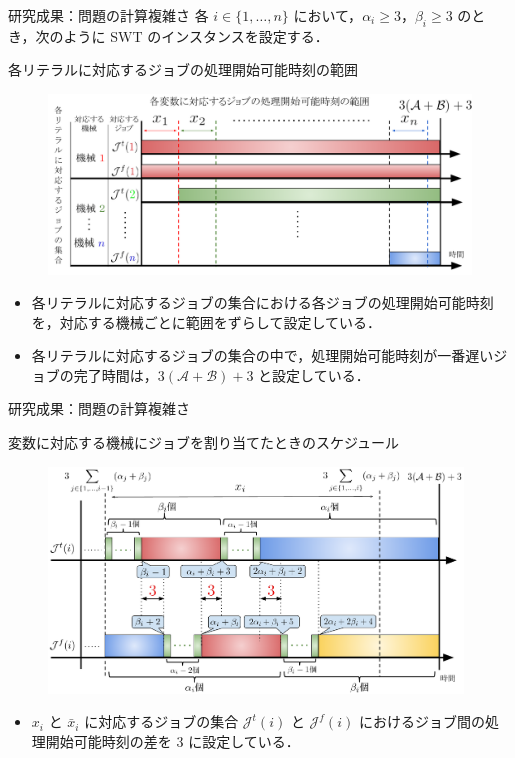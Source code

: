 \documentclass[dvipdfmx]{beamer}
\begin{document}
    \begin{frame}{研究成果：問題の計算複雑さ}
      各 $i \in \{ 1,\ldots,n\}$ において，$\alpha_i \ge 3$，$\beta_i \ge 3$ のとき，次のように SWT のインスタンスを設定する．
      \begin{block}{各リテラルに対応するジョブの処理開始可能時刻の範囲}
        \begin{figure}[h]
          \centering
          \includegraphics[width = 10 cm]{figure/3SAT3.pdf}
        \end{figure}
      \end{block}
      \begin{itemize}
        \item 各リテラルに対応するジョブの集合における各ジョブの処理開始可能時刻を，対応する機械ごとに範囲をずらして設定している．
        \item 各リテラルに対応するジョブの集合の中で，処理開始可能時刻が一番遅いジョブの完了時間は，$3(\mathcal{A} + \mathcal{B}) + 3$ と設定している．
      \end{itemize}
    \end{frame}

    \begin{frame}{研究成果：問題の計算複雑さ}
      \begin{block}{変数に対応する機械にジョブを割り当てたときのスケジュール}
        \begin{figure}[h]
          \centering
          \includegraphics[width = 11cm]{figure/3SAT4.pdf}
        \end{figure}
      \end{block}
      \begin{itemize}
        \item $x_i$ と $\bar x_i$ に対応するジョブの集合 $\mathcal{J}^t(i)$ と $\mathcal{J}^f(i)$ におけるジョブ間の処理開始可能時刻の差を $3$ に設定している．
      \end{itemize}
    \end{frame}
\end{document}
